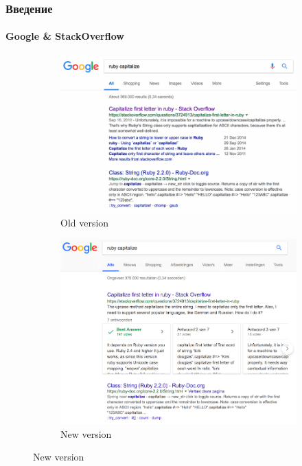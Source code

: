 \documentclass[10pt]{beamer}
\begin{document}
\begin{frame}
\frametitle{Введение}
\framesubtitle{Google \& StackOverflow}

\begin{figure}
	\begin{subfigure}[b]{.49\linewidth}
		\centering
		\includegraphics[width=\linewidth]{images/google_search_old.png}
		\caption{Old version}
	\end{subfigure}\hfill
	\begin{subfigure}[b]{.49\linewidth}
		\centering
		\includegraphics[width=\linewidth]{images/google_search_new.png}
		\caption{New version}
	\end{subfigure}%
\end{figure}

\end{frame}
\end{document}
